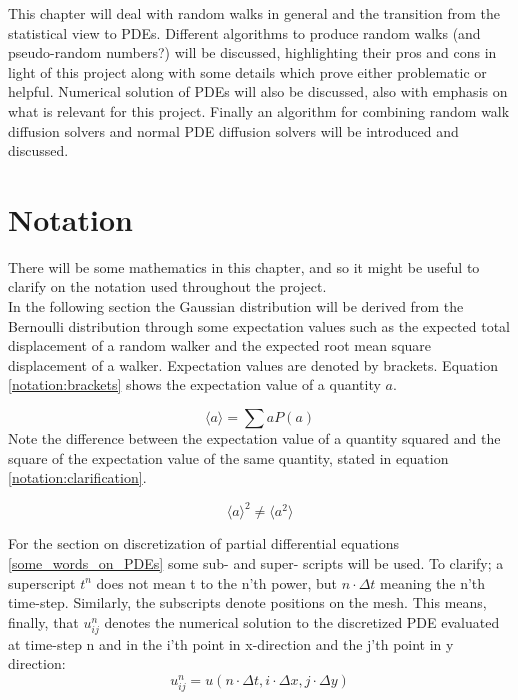 
This chapter will deal with random walks in general and the transition from the statistical view to PDEs. 
Different algorithms to produce random walks (and pseudo-random numbers?) will be discussed, highlighting their pros and cons in light of this project along with some details which prove either problematic or helpful. 
Numerical solution of PDEs will also be discussed, also with emphasis on what is relevant for this project. 
Finally an algorithm for combining random walk diffusion solvers and normal PDE diffusion solvers will be introduced and discussed.

\section{Notation}

There will be some mathematics in this chapter, and so it might be useful to clarify on the notation used throughout the project.\\

In the following section the Gaussian distribution will be derived from the Bernoulli distribution through some expectation values such as the expected total displacement of a random walker and the expected root mean square displacement of a walker. 
Expectation values are denoted by brackets. Equation \eqref{notation:brackets} shows the expectation value of a quantity $a$. 

\begin{equation}\label{notation:brackets}
 \langle a \rangle = \sum aP(a)
\end{equation}
Note the difference between the expectation value of a quantity squared and the square of the expectation value of the same quantity, stated in equation \ref{notation:clarification}.

\begin{equation}\label{notation:clarification}
 \langle a \rangle^2 \neq \langle a^2 \rangle
\end{equation}

For the section on discretization of partial differential equations \ref{some_words_on_PDEs} some sub- and super- scripts will be used. 
To clarify; a superscript $t^n$ does not mean t to the n'th power, but $n\cdot\Delta t$ meaning the n'th time-step. 
Similarly, the subscripts denote positions on the mesh. This means, finally, that $u^n_{ij}$ denotes the numerical solution to the discretized PDE evaluated at time-step n and in the i'th point in x-direction and the j'th point in y direction:
\begin{equation*}
 u^n_{ij} = u(n\cdot\Delta t,i\cdot\Delta x, j\cdot\Delta y)
\end{equation*}

